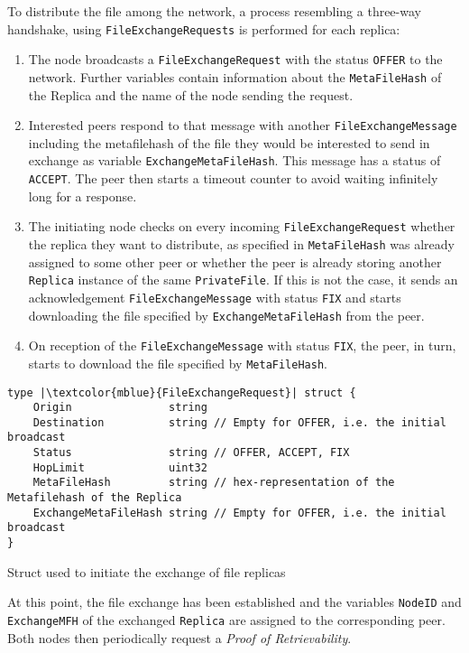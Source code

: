 \documentclass{article}
\begin{document}
To distribute the file among the network, a process resembling a three-way handshake, using \texttt{FileExchangeRequests} is performed for each replica:
\begin{enumerate}
	\item The node broadcasts a \texttt{FileExchangeRequest} with the status \texttt{OFFER} to the network. Further variables contain information about the \texttt{MetaFileHash} of the Replica and the name of the node sending the request.
	\item Interested peers respond to that message with another \texttt{FileExchangeMessage} including the metafilehash of the file they would be interested to send in exchange as variable \texttt{ExchangeMetaFileHash}. This message has a status of \texttt{ACCEPT}. The peer then starts a timeout counter to avoid waiting infinitely long for a response.
	\item The initiating node checks on every incoming \texttt{FileExchangeRequest} whether the replica they want to distribute, as specified in \texttt{MetaFileHash} was already assigned to some other peer or whether the peer is already storing another \texttt{Replica} instance of the same \texttt{PrivateFile}. If this is not the case, it sends an acknowledgement \texttt{FileExchangeMessage} with status \texttt{FIX} and starts downloading the file specified by \texttt{ExchangeMetaFileHash} from the peer. 
	\item On reception of the \texttt{FileExchangeMessage} with status \texttt{FIX}, the peer, in turn, starts to download the file specified by \texttt{MetaFileHash}.
\end{enumerate}

\begin{listing}
\begin{verbatim}
type |\textcolor{mblue}{FileExchangeRequest}| struct {
	Origin               string 
	Destination          string // Empty for OFFER, i.e. the initial broadcast
	Status               string // OFFER, ACCEPT, FIX
	HopLimit             uint32
	MetaFileHash         string // hex-representation of the Metafilehash of the Replica
	ExchangeMetaFileHash string // Empty for OFFER, i.e. the initial broadcast
}
\end{verbatim}
\caption{Struct used to initiate the exchange of file replicas}
\end{listing}

\noindent 
At this point, the file exchange has been established and the variables \texttt{NodeID} and \texttt{ExchangeMFH} of the exchanged \texttt{Replica} are assigned to the corresponding peer. Both nodes then periodically request a \emph{Proof of Retrievability}.
\\\vspace{0.5em}
\end{document}
